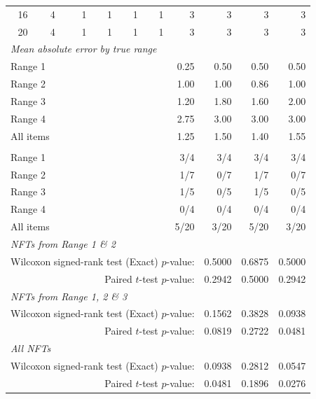 \documentclass[12pt,reqno]{amsart}
\begin{document}
\begin{table}[htbp]
\begin{tabular}{@{}ccrrrrrrrr@{}}
16 & 4 & 1 & 1 & 1 & 1 & 3 & 3 & 3 & 3\\
20 & 4 & 1 & 1 & 1 & 1 & 3 & 3 & 3 & 3\\
\midrule
\multicolumn{6}{l}{\textit{Mean absolute error by true range}}\\
\multicolumn{6}{l}{Range 1}
& 0.25 & 0.50 & 0.50 & 0.50\\
\multicolumn{6}{l}{Range 2}
& 1.00 & 1.00 & 0.86 & 1.00\\
\multicolumn{6}{l}{Range 3}
& 1.20 & 1.80 & 1.60 & 2.00\\
\multicolumn{6}{l}{Range 4}
& 2.75 & 3.00 & 3.00 & 3.00\\
\multicolumn{6}{l}{All items}
& 1.25 & 1.50 & 1.40 & 1.55\\
\addlinespace[3pt]
\multicolumn{6}{l}{\textit{Exact predictions by true range}}\\
\multicolumn{6}{l}{Range 1}
& 3/4 & 3/4 & 3/4 & 3/4\\
\multicolumn{6}{l}{Range 2}
& 1/7 & 0/7 & 1/7 & 0/7\\
\multicolumn{6}{l}{Range 3}
& 1/5 & 0/5 & 1/5 & 0/5\\
\multicolumn{6}{l}{Range 4}
& 0/4 & 0/4 & 0/4 & 0/4\\
\multicolumn{6}{l}{All items}
& 5/20 & 3/20 & 5/20 & 3/20\\
\midrule
\multicolumn{10}{l}{\textit{NFTs from Range 1 \& 2}}\\

\multicolumn{7}{r}{Wilcoxon signed-rank test (Exact) $p$-value:}
& 0.5000 & 0.6875 & 0.5000\\
\multicolumn{7}{r}{Paired $t$-test $p$-value:}
& 0.2942 & 0.5000 & 0.2942\\
\midrule
\multicolumn{10}{l}{\textit{NFTs from Range 1, 2 \& 3}}\\
\multicolumn{7}{r}{Wilcoxon signed-rank test (Exact) $p$-value:}
& 0.1562 & 0.3828 & 0.0938\\
\multicolumn{7}{r}{Paired $t$-test $p$-value:}
& 0.0819 & 0.2722 & 0.0481\\
\midrule
\multicolumn{10}{l}{\textit{All NFTs}}\\
\multicolumn{7}{r}{Wilcoxon signed-rank test (Exact) $p$-value:}
& 0.0938 & 0.2812 & 0.0547\\
\multicolumn{7}{r}{Paired $t$-test $p$-value:}
& 0.0481 & 0.1896 & 0.0276\\
\bottomrule
\end{tabular}


\end{table}
\end{document}
